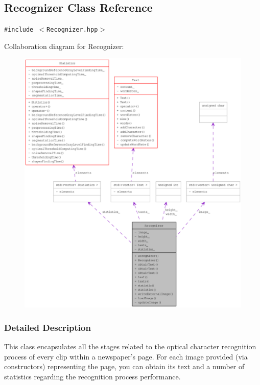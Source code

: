 \hypertarget{class_recognizer}{
\subsection{Recognizer Class Reference}
\label{class_recognizer}
}
{\tt \#include $<$Recognizer.hpp$>$}

Collaboration diagram for Recognizer:\nopagebreak
\begin{figure}[H]
\begin{center}
\leavevmode
\includegraphics[width=400pt]{class_recognizer__coll__graph}
\end{center}
\end{figure}


\subsubsection{Detailed Description}
This class encapsulates all the stages related to the optical character recognition process of every clip within a newspaper's page. For each image provided (via constructors) representing the page, you can obtain its text and a number of statistics regarding the recognition process performance.

